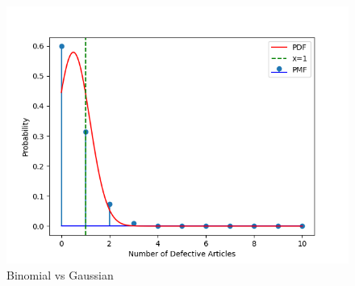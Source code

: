 \documentclass[journal,12pt,onecolumn]{IEEEtran}
\begin{document}
\begin{figure}[H]
\centering
\includegraphics[width=\columnwidth]{./figs/figure1.png}
\caption{Binomial vs Gaussian}
\end{figure}
\end{document}
